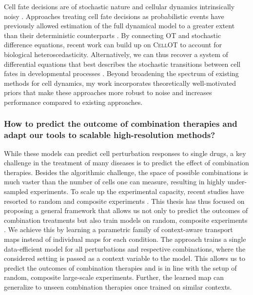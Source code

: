 Cell fate decisions are of stochastic nature and cellular dynamics intrinsically noisy \citep{wilkinson2009stochastic}.
Approaches treating cell fate decisions as probabilistic events have previously allowed estimation of the full dynamical model to a greater extent than their deterministic counterparts \citep{bergen2020generalizing}.
By connecting OT and stochastic difference equations, recent work \citep{bunne2022recovering, somnath2023aligned} can build up on \textsc{CellOT} to account for biological heteroscedasticity.
Alternatively, we can thus recover a system of differential equations that best describes the stochastic transitions between cell fates in developmental processes \citep{bunne2022recovering, somnath2023aligned}.
Beyond broadening the spectrum of existing methods for cell dynamics, my work incorporates theoretically well-motivated priors that make these approaches more robust to noise and increases performance compared to existing approaches.

\subsubsection*{\textbf{How to predict the outcome of combination therapies and adapt our tools to scalable high-resolution methods?}}

 While these models can predict cell perturbation responses to single drugs, a key challenge in the treatment of many diseases is to predict the effect of combination therapies. Besides the algorithmic challenge, the space of possible combinations is much vaster than the number of cells one can measure, resulting in highly under-sampled experiments. To scale up the experimental capacity, recent studies have resorted to random and composite experiments \citep{norman2019exploring, cleary2020necessity}.
This thesis has thus focused on proposing a general framework that allows us not only to predict the outcomes of combination treatments but also train models on random, composite experiments \citep{bunne2022supervised}.
We achieve this by learning a parametric family of context-aware transport maps instead of individual maps for each condition.
The approach trains a single data-efficient model for all perturbations and respective combinations, where the considered setting is passed as a context variable to the model. This allows us to predict the outcomes of combination therapies and is in line with the setup of random, composite large-scale experiments.
Further, the learned map can generalize to unseen combination therapies once trained on similar contexts.


